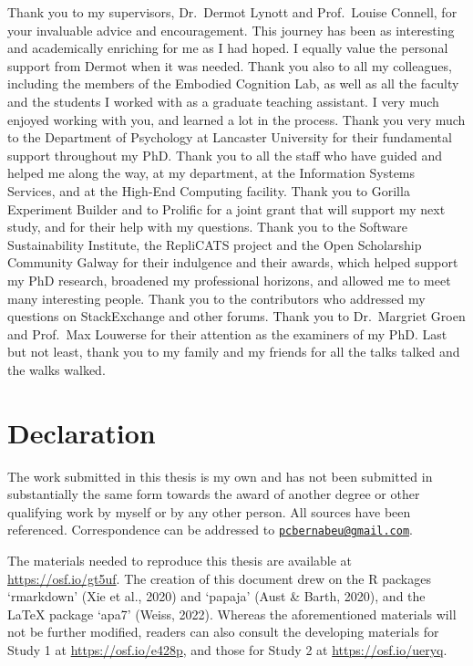 \documentclass[
  12pt,
  man,floatsintext]{apa7}
\begin{document}
Thank you to my supervisors, Dr.~Dermot Lynott and Prof.~Louise Connell, for your invaluable advice and encouragement. This journey has been as interesting and academically enriching for me as I had hoped. I equally value the personal support from Dermot when it was needed. Thank you also to all my colleagues, including the members of the Embodied Cognition Lab, as well as all the faculty and the students I worked with as a graduate teaching assistant. I very much enjoyed working with you, and learned a lot in the process. Thank you very much to the Department of Psychology at Lancaster University for their fundamental support throughout my PhD. Thank you to all the staff who have guided and helped me along the way, at my department, at the Information Systems Services, and at the High-End Computing facility. Thank you to Gorilla Experiment Builder and to Prolific for a joint grant that will support my next study, and for their help with my questions. Thank you to the Software Sustainability Institute, the RepliCATS project and the Open Scholarship Community Galway for their indulgence and their awards, which helped support my PhD research, broadened my professional horizons, and allowed me to meet many interesting people. Thank you to the contributors who addressed my questions on StackExchange and other forums. Thank you to Dr.~Margriet Groen and Prof.~Max Louwerse for their attention as the examiners of my PhD. Last but not least, thank you to my family and my friends for all the talks talked and the walks walked.

\newpage

\hypertarget{declaration}{%
\section{Declaration}\label{declaration}}

The work submitted in this thesis is my own and has not been submitted in substantially the same form towards the award of another degree or other qualifying work by myself or by any other person. All sources have been referenced. Correspondence can be addressed to \href{mailto:pcbernabeu@gmail.com}{\nolinkurl{pcbernabeu@gmail.com}}.

The materials needed to reproduce this thesis are available at \url{https://osf.io/gt5uf}. The creation of this document drew on the R packages `rmarkdown' (Xie et al., 2020) and `papaja' (Aust \& Barth, 2020), and the LaTeX package `apa7' (Weiss, 2022). Whereas the aforementioned materials will not be further modified, readers can also consult the developing materials for Study 1 at \url{https://osf.io/e428p}, and those for Study 2 at \url{https://osf.io/ueryq}.
\end{document}
